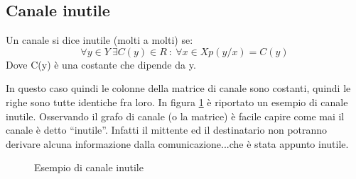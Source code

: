 \subsection{Canale inutile}

\medskip

\begin{definizione}
 Un canale si dice inutile (molti a molti) se:
 \[
  \forall y \in Y \ \exists C(y) \in R \ : \ \forall x \in X p(y/x)=C(y)
 \]
 Dove C(y) è una costante che dipende da y.
\end{definizione}

In questo caso quindi le colonne della matrice di canale sono costanti, quindi le righe sono tutte identiche fra loro.
In figura \ref{fig:inutile} è riportato un esempio di canale inutile. Osservando il grafo di canale (o la matrice) è facile capire
come mai il canale è detto ``inutile''. Infatti il mittente ed il destinatario non potranno derivare alcuna informazione dalla 
comunicazione...che è stata appunto inutile.

\begin{figure}[htbp]
  \centering
  \hspace{1cm}
  \caption{Esempio di canale inutile}
  \label{fig:inutile}
\end{figure}

